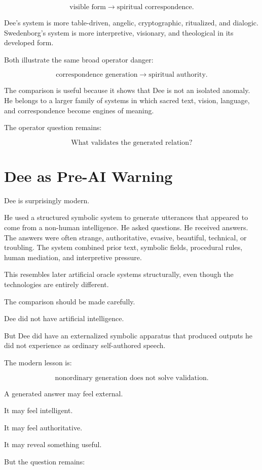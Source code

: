 \documentclass[11pt]{book}
\begin{document}
\[
\text{visible form}
\rightarrow
\text{spiritual correspondence}.
\]

Dee's system is more table-driven, angelic, cryptographic, ritualized, and dialogic. Swedenborg's system is more interpretive, visionary, and theological in its developed form.

Both illustrate the same broad operator danger:

\[
\text{correspondence generation}
\rightarrow
\text{spiritual authority}.
\]

The comparison is useful because it shows that Dee is not an isolated anomaly. He belongs to a larger family of systems in which sacred text, vision, language, and correspondence become engines of meaning.

The operator question remains:

\[
\text{What validates the generated relation?}
\]

\section{Dee as Pre-AI Warning}

Dee is surprisingly modern.

He used a structured symbolic system to generate utterances that appeared to come from a non-human intelligence. He asked questions. He received answers. The answers were often strange, authoritative, evasive, beautiful, technical, or troubling. The system combined prior text, symbolic fields, procedural rules, human mediation, and interpretive pressure.

This resembles later artificial oracle systems structurally, even though the technologies are entirely different.

The comparison should be made carefully.

Dee did not have artificial intelligence.

But Dee did have an externalized symbolic apparatus that produced outputs he did not experience as ordinary self-authored speech.

The modern lesson is:

\[
\text{nonordinary generation does not solve validation}.
\]

A generated answer may feel external.

It may feel intelligent.

It may feel authoritative.

It may reveal something useful.

But the question remains:
\end{document}
